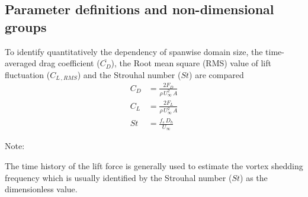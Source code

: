 \documentclass[preprint, letterpaper, nobibnotes, aps, superscriptaddress,prb]{revtex4-1}
\begin{document}
\subsection{Parameter definitions and non-dimensional groups}
To identify quantitatively the dependency of spanwise domain size, the time-averaged drag coefficient ($\overline{C_D}$), the Root mean square (RMS) value of lift fluctuation ($C_{L\,,RMS}$) and the Strouhal number ($St$) are compared
\begin{align*}
C_D &= \frac{2F_D}{\rho\,U_{\infty}^2\,A} \\ 
C_L &= \frac{2F_L}{\rho\,U_{\infty}^2\,A}  \\ 
St &= \frac{f_s\,D_h}{U_{\infty}}
\end{align*}

Note:

The time history of the lift force is generally used to estimate the vortex shedding frequency which is usually identified by the Strouhal number ($St$) as the dimensionless value.
\end{document}
